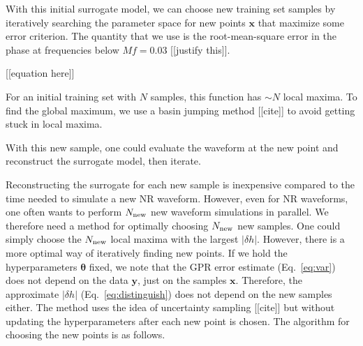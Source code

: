 \documentclass[prd,aps,letter,twocolumn,floatfix,notitlepage,nofootinbib]{revtex4-1}
\begin{document}
With this initial surrogate model, we can choose new training set samples by iteratively searching the parameter space for new points ${\bm x}$ that maximize some error criterion. The quantity that we use is the root-mean-square error in the phase at frequencies below $Mf=0.03$ [[justify this]].

[[equation here]]

For an initial training set with $N$ samples, this function has $\sim N$ local maxima. To find the global maximum, we use a basin jumping method [[cite]] to avoid getting stuck in local maxima.

%


With this new sample, one could evaluate the waveform at the new point and reconstruct the surrogate model, then iterate.

Reconstructing the surrogate for each new sample is inexpensive compared to the time needed to simulate a new NR waveform. 
However, even for NR waveforms, one often wants to perform $N_{\rm new}$ new waveform simulations in parallel. 
We therefore need a method for optimally choosing $N_{\rm new}$ new samples. One could simply choose the 
$N_{\rm new}$ local maxima with the largest $|\delta h |$. However, there is a more optimal way of iteratively finding new points.
If we hold the hyperparameters ${\bm \theta}$ fixed, we note that the GPR error estimate (Eq.~\eqref{eq:var}) does not depend
on the data ${\bm y}$, just on the samples ${\bm x}$. Therefore, the approximate $|\delta h |$ (Eq.~\eqref{eq:distinguish}) does not depend
on the new samples either. The method uses the idea of uncertainty sampling [[cite]] but without updating the hyperparameters
after each new point is chosen. The algorithm for choosing the new points is as follows.
\end{document}
